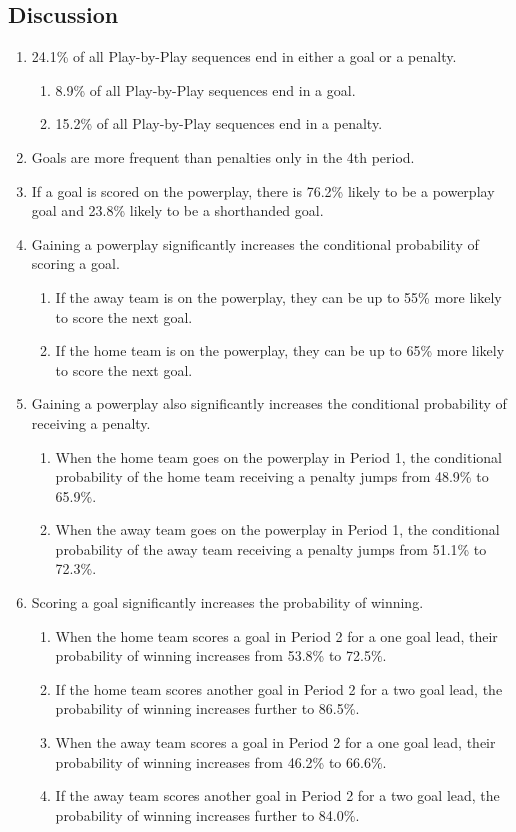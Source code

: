 \documentclass[]{article}
\begin{document}
\subsection{Discussion}

\begin{enumerate}
\item 24.1\% of all Play-by-Play sequences end in either a goal or a penalty.
\begin{enumerate}
\item 8.9\% of all Play-by-Play sequences end in a goal.
\item 15.2\% of all Play-by-Play sequences end in a penalty.
\end{enumerate}
\item Goals are more frequent than penalties only in the 4th period.
\item If a goal is scored on the powerplay, there is 76.2\% likely to be a powerplay goal and 23.8\% likely to be a shorthanded goal.
\item Gaining a powerplay significantly increases the conditional probability of scoring a goal.
\begin{enumerate}
\item If the away team is on the powerplay, they can be up to 55\% more likely to score the next goal.
\item If the home team is on the powerplay, they can be up to 65\% more likely to score the next goal.
\end{enumerate}
\item Gaining a powerplay also significantly increases the conditional probability of receiving a penalty.
\begin{enumerate}
\item When the home team goes on the powerplay in Period 1, the conditional probability of the home team receiving a penalty jumps from 48.9\% to 65.9\%.
\item When the away team goes on the powerplay in Period 1, the conditional probability of the away team receiving a penalty jumps from 51.1\% to 72.3\%.
\end{enumerate}
\item Scoring a goal significantly increases the probability of winning.
\begin{enumerate}
\item When the home team scores a goal in Period 2 for a one goal lead, their probability of winning increases from 53.8\% to 72.5\%.
\item If the home team scores another goal in Period 2 for a two goal lead, the probability of winning increases further to 86.5\%.
\item When the away team scores a goal in Period 2 for a one goal lead, their probability of winning increases from 46.2\% to 66.6\%.
\item If the away team scores another goal in Period 2 for a two goal lead, the probability of winning increases further to 84.0\%.
\end{enumerate}
\end{enumerate}
\end{document}
